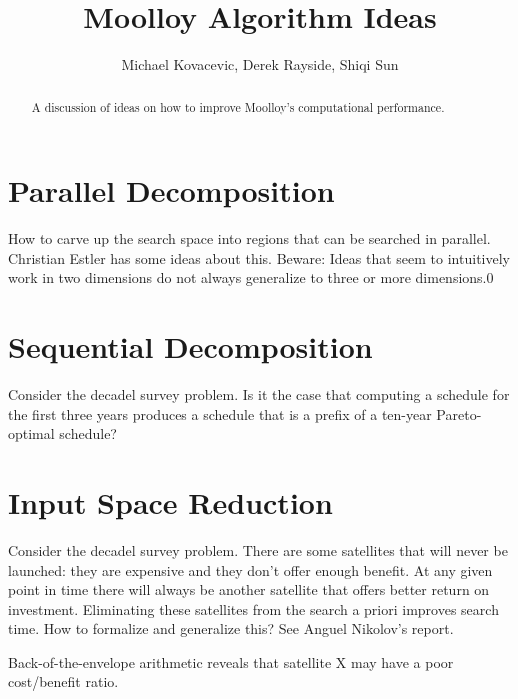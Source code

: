 \documentclass[11pt]{article}
\title{Moolloy Algorithm Ideas}
\author{Michael Kovacevic, Derek Rayside, Shiqi Sun}
\begin{document}
\maketitle

\begin{abstract}

A discussion of ideas on how to improve Moolloy's computational
performance.

\end{abstract}

\tableofcontents
\newpage

\section{Parallel Decomposition}

How to carve up the search space into regions that can be searched in
parallel.  Christian Estler has some ideas about this.  Beware: Ideas
that seem to intuitively work in two dimensions do not always
generalize to three or more dimensions.0

\section{Sequential Decomposition}

Consider the decadel survey problem.  Is it the case that computing a
schedule for the first three years produces a schedule that is a
prefix of a ten-year Pareto-optimal schedule?


\section{Input Space Reduction}

Consider the decadel survey problem.  There are some satellites that
will never be launched:  they are expensive and they don't offer
enough benefit.  At any given point in time there will always be
another satellite that offers better return on investment.
Eliminating these satellites from the search a priori improves search
time.  How to formalize and generalize this?  See Anguel Nikolov's
report.


Back-of-the-envelope arithmetic reveals that satellite X may have a
poor cost/benefit ratio.  
\end{document}
